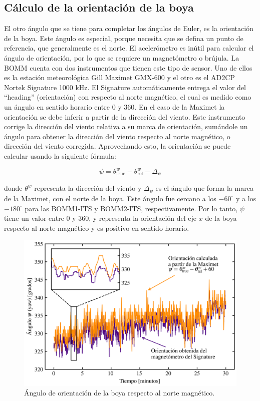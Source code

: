 \documentclass[11pt]{article}
\begin{document}

\subsection{Cálculo de la orientación de la boya}

El otro ángulo que se tiene para completar los ángulos de Euler, es la
orientación de la boya. Este ángulo es especial, porque necesita que se defina
un punto de referencia, que generalmente es el norte. El acelerómetro es inútil
para calcular el ángulo de orientación, por lo que se requiere un magnetómetro o
brújula. La BOMM cuenta con dos instrumentos que tienen este tipo de sensor. Uno
de ellos es la estación meteorológica Gill Maximet GMX-600 y el otro es el AD2CP
Nortek Signature 1000 kHz. El Signature automáticamente entrega el valor del
``heading'' (orientación) con respecto al norte magnético, el cual es medido
como un ángulo en sentido horario entre 0 y 360. En el caso de la Maximet la
orientación se debe inferir a partir de la dirección del viento. Este
instrumento corrige la dirección del viento relativa a su marca de orientación,
sumándole un ángulo para obtener la dirección del viento respecto al norte
magnético, o dirección del viento corregida. Aprovechando esto, la orientación
se puede calcular usando la siguiente fórmula:

\begin{equation}
  \psi = \theta^{w}_\mathrm{true} - \theta^{w}_\mathrm{rel} - \Delta_\psi
\end{equation}

donde $\theta^w$ representa la dirección del viento y $\Delta_\psi$ es el ángulo
que forma la marca de la Maximet, con el norte de la boya.  Este ángulo fue
cercano a los $-60^\circ$ y a los $-180^\circ$ para las BOMM1-ITS y BOMM2-ITS,
respectivamente.  Por lo tanto, $\psi$ tiene un valor entre 0 y 360, y
representa la orientación del eje $x$ de la boya respecto al norte magnético y
es positivo en sentido horario.

\begin{figure}[htpb]
  \centering
  \includegraphics[width=0.8\linewidth]{./figures/heading_angle.png}
  \caption{Ángulo de orientación de la boya respecto al norte magnético.}
  \label{fig:heaging_angle}
\end{figure}
\end{document}

